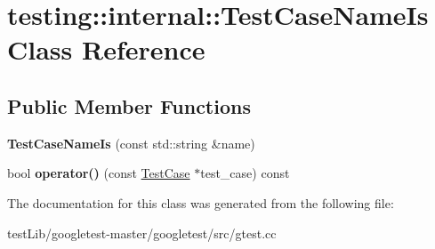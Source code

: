 \hypertarget{classtesting_1_1internal_1_1TestCaseNameIs}{}\section{testing\+:\+:internal\+:\+:Test\+Case\+Name\+Is Class Reference}
\label{classtesting_1_1internal_1_1TestCaseNameIs}
\subsection*{Public Member Functions}
\begin{DoxyCompactItemize}
\item 
\mbox{\label{classtesting_1_1internal_1_1TestCaseNameIs_a7c983707f4cfe7f36dbabc95da5113c4}} 
{\bfseries Test\+Case\+Name\+Is} (const std\+::string \&name)
\item 
\mbox{\label{classtesting_1_1internal_1_1TestCaseNameIs_aa96c4e9facbaa7043c8f0b34465d1eae}} 
bool {\bfseries operator()} (const \hyperlink{classtesting_1_1TestCase}{Test\+Case} $\ast$test\+\_\+case) const
\end{DoxyCompactItemize}


The documentation for this class was generated from the following file\+:\begin{DoxyCompactItemize}
\item 
test\+Lib/googletest-\/master/googletest/src/gtest.\+cc\end{DoxyCompactItemize}
